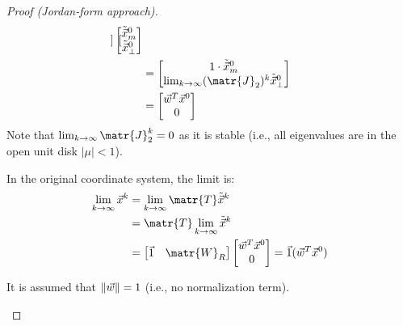 \begin{theorem}
\begin{proof}[Proof (Jordan-form approach)]
\[\begin{split}
\begin{bmatrix}
                \end{bmatrix} \begin{bmatrix}
                    \tilde{\x}^0_{m} \\ \tilde{\x}^0_{\bot}
                \end{bmatrix} \\
                &= \begin{bmatrix}
                    1 \cdot \tilde{\x}^0_{m} \\ 
                    \lim_{k \rightarrow \infty} (\matr{J}_2)^k \tilde{\x}^0_{\bot}
                \end{bmatrix} \\
                &= \begin{bmatrix}
                    \w^T \x^0 \\ 
                    0
                \end{bmatrix} \\
            \end{split}
        \]
        Note that $\lim_{k \rightarrow \infty} \matr{J}_2^k = 0$ as it is stable (i.e., all eigenvalues are in the open unit disk $|\mu| < 1$).
    
        In the original coordinate system, the limit is:
        \[
            \begin{split}
                \lim_{k \rightarrow \infty} \x^k 
                &= \lim_{k \rightarrow \infty} \matr{T} \tilde{\x}^k \\
                &= \matr{T} \lim_{k \rightarrow \infty} \tilde{\x}^k \\
                &= \begin{bmatrix}
                    \vec{1} & \matr{W}_R
                \end{bmatrix} \begin{bmatrix}
                    \w^T \x^0 \\ 
                    0
                \end{bmatrix} 
                = \vec{1} (\w^T \x^0)
            \end{split}
        \]
        
        \indenttbox
        \begin{remark}
            It is assumed that $\Vert {\vec{w}} \Vert = 1$ (i.e., no normalization term).
        \end{remark}
    \end{proof}
\end{theorem}

